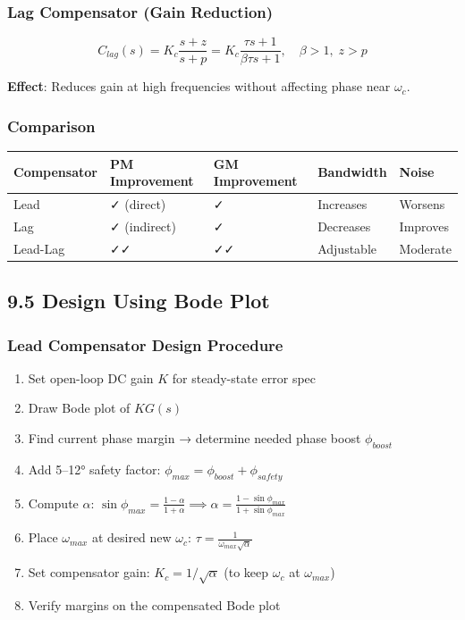 \documentclass[11pt,a4paper]{book}
\begin{document}
\subsubsection{Lag Compensator (Gain Reduction)}

\[C_{lag}(s) = K_c \frac{s + z}{s + p} = K_c \frac{\tau s + 1}{\beta \tau s + 1}, \quad \beta > 1, \; z > p\]

\textbf{Effect}: Reduces gain at high frequencies without affecting phase near $\omega_c$.

\subsubsection{Comparison}

\begin{center}
\begin{tabular}{|l|l|l|l|l|}
\hline
Compensator & PM Improvement & GM Improvement & Bandwidth & Noise \\
\hline
Lead & ✓ (direct) & ✓ & Increases & Worsens \\
Lag & ✓ (indirect) & ✓ & Decreases & Improves \\
Lead-Lag & ✓✓ & ✓✓ & Adjustable & Moderate \\
\hline
\end{tabular}
\end{center}

\medskip\noindent\hrulefill\medskip

\subsection{9.5 Design Using Bode Plot}

\subsubsection{Lead Compensator Design Procedure}

\begin{enumerate}
\item Set open-loop DC gain $K$ for steady-state error spec
\item Draw Bode plot of $KG(s)$
\item Find current phase margin → determine needed phase boost $\phi_{boost}$
\item Add 5–12° safety factor: $\phi_{max} = \phi_{boost} + \phi_{safety}$
\item Compute $\alpha$: $\sin\phi_{max} = \frac{1-\alpha}{1+\alpha} \implies \alpha = \frac{1-\sin\phi_{max}}{1+\sin\phi_{max}}$
\item Place $\omega_{max}$ at desired new $\omega_c$: $\tau = \frac{1}{\omega_{max}\sqrt{\alpha}}$
\item Set compensator gain: $K_c = 1/\sqrt{\alpha}$ (to keep $\omega_c$ at $\omega_{max}$)
\item Verify margins on the compensated Bode plot
\end{enumerate}
\end{document}
